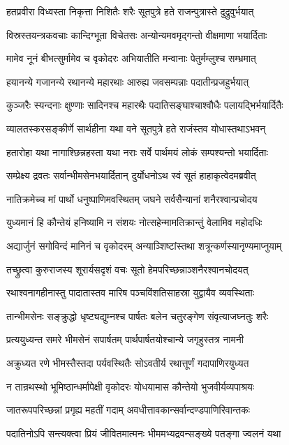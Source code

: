 \twolineshloka
{हतप्रवीरा विध्वस्ता निकृत्ता निशितैः शरैः}
{सूतपुत्रे हते राजन्पुत्रास्ते दुद्रुवुर्भयात्}


\twolineshloka
{विस्रस्तयन्त्रकवचाः कान्दिग्भूता विचेतसः}
{अन्योन्यमवमृद्गन्तो वीक्षमाणा भयार्दिताः}


\twolineshloka
{मामेव नूनं बीभत्सुर्मामेव च वृकोदरः}
{अभियातीति मन्वानाः पेतुर्मम्लुश्च सम्भ्रमात्}


\twolineshloka
{हयानन्ये गजानन्ये रथानन्ये महारथाः}
{आरुह्य जवसम्पन्नाः पदातीन्प्रजहुर्भयात्}


\twolineshloka
{कुञ्जरैः स्यन्दनाः क्षुण्णाः सादिनश्च महारथैः}
{पदातिसङ्घाश्चाश्वौधैः पलायद्भिर्भयार्दितैः}


\twolineshloka
{व्यालतस्करसङ्कीर्णे सार्थहीना यथा वने}
{सूतपुत्रे हते राजंस्तव योधास्तथाऽभवन्}


\twolineshloka
{हतारोहा यथा नागाश्छिन्नहस्ता यथा नराः}
{सर्वे पार्थमयं लोकं सम्पश्यन्तो भयार्दिताः}


\twolineshloka
{सम्प्रेक्ष्य द्रवतः सर्वान्भीमसेनभयार्दितान्}
{दुर्योधनोऽथ स्वं सूतं हाहाकृत्वेदमब्रवीत्}


\twolineshloka
{नातिक्रमेच्च मां पार्थो धनुष्पाणिमवस्थितम्}
{जघने सर्वसैन्यानां शनैरश्वान्प्रचोदय}


\twolineshloka
{युध्यमानं हि कौन्तेयं हनिष्यामि न संशयः}
{नोत्सहेन्मामतिक्रान्तुं वेलामिव महोदधिः}


\twolineshloka
{अद्यार्जुनं सगोविन्दं मानिनं च वृकोदरम्}
{अन्याञ्शिष्टांस्तथा शत्रून्कर्णस्यानृण्यमाप्नुयाम्}


\twolineshloka
{तच्छ्रुत्वा कुरुराजस्य शूरार्यसदृशं वचः}
{सूतो हेमपरिच्छन्नाञ्शनैरश्वानचोदयत्}


\twolineshloka
{रथाश्वनागहीनास्तु पादातास्तव मारिष}
{पञ्चविंशतिसाहस्रा युद्वायैव व्यवस्थिताः}


\twolineshloka
{तान्भीमसेनः सङ्क्रुद्धो धृष्ट्यद्युम्नश्च पार्षतः}
{बलेन चतुरङ्गेण संवृत्याजघ्नतुः शरैः}


\twolineshloka
{प्रत्ययुध्यन्त समरे भीमसेनं सपार्षतम्}
{पार्थपार्षतयोश्चान्ये जगृहुस्तत्र नामनी}


\twolineshloka
{अक्रुध्यत रणे भीमस्तैस्तदा पर्यवस्थितैः}
{सोऽवतीर्य रथात्तूर्णं गदापाणिरयुध्यत}


\twolineshloka
{न तान्रथस्थो भूमिष्ठान्धर्मापेक्षी वृकोदरः}
{योधयामास कौन्तेयो भुजवीर्यव्यपाश्रयः}


\twolineshloka
{जातरूपपरिच्छन्नां प्रगृह्य महतीं गदाम्}
{अवधीत्तावकान्सर्वान्दण्डपाणिरिवान्तकः}


\twolineshloka
{पदातिनोऽपि सन्त्यक्त्वा प्रियं जीवितमात्मनः}
{भीममभ्यद्रवन्सङ्ख्ये पतङ्गा ज्वलनं यथा}


